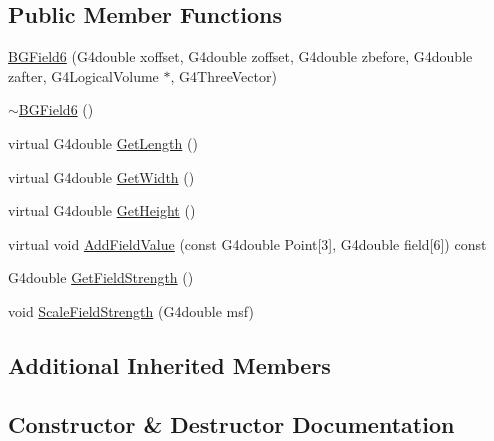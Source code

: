 \subsection*{Public Member Functions}
\begin{DoxyCompactItemize}
\item 
\hyperlink{classBGField6_a6f02a8a1e9643d6177d5f3f30d7a46e0}{B\+G\+Field6} (G4double xoffset, G4double zoffset, G4double zbefore, G4double zafter, G4\+Logical\+Volume $\ast$, G4\+Three\+Vector)
\item 
\hyperlink{classBGField6_a7e62200589506516d75a91db198f6320}{$\sim$\+B\+G\+Field6} ()
\item 
virtual G4double \hyperlink{classBGField6_ae0703e3eeb230040b028aaae44b2f2a4}{Get\+Length} ()
\item 
virtual G4double \hyperlink{classBGField6_a620f1dfb4e72bf4cd8156eff68f4359a}{Get\+Width} ()
\item 
virtual G4double \hyperlink{classBGField6_a47b7a214491b4317706fcd61d0f9feef}{Get\+Height} ()
\item 
virtual void \hyperlink{classBGField6_aaacc495750db2c0672cc4c7be39a6c8c}{Add\+Field\+Value} (const G4double Point\mbox{[}3\mbox{]}, G4double field\mbox{[}6\mbox{]}) const 
\item 
G4double \hyperlink{classBGField6_a4af95bf2bc47babe4c29f814bb8afa1c}{Get\+Field\+Strength} ()
\item 
void \hyperlink{classBGField6_a8045ecf2de2401570f87f72270875b72}{Scale\+Field\+Strength} (G4double msf)
\end{DoxyCompactItemize}
\subsection*{Additional Inherited Members}


\subsection{Constructor \& Destructor Documentation}

